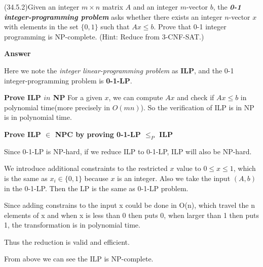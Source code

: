 \documentclass[12pt]{article}
\begin{document}
(34.5.2)Given an integer $m \times n$ matrix $A$ and an integer $m$-vector $b$, the \textbf{\textit{0-1 integer-programming problem}} asks whether there exists an integer $n$-vector $x$ with elements in the set $\{0, 1\}$ such that $Ax \le b$. Prove that 0-1 integer programming is NP-complete. (Hint: Reduce from 3-CNF-SAT.)

\textbf{Answer}

Here we note the \textit{integer linear-programming problem} as \textbf{ILP}, and the 0-1 integer-programming problem is \textbf{0-1-LP}.



\textbf{Prove ILP $in$ NP}
For a given $x$, we can compute $Ax$ and check if $Ax \leq b$ in polynomial time(more precisely in $O(mn)$). So the verification of ILP is in NP is in polynomial time.

\textbf{Prove ILP $\in$ NPC by proving 0-1-LP $\leq_{P}$ ILP}

Since 0-1-LP is NP-hard, if we reduce ILP to 0-1-LP, ILP will also be NP-hard. 

We introduce additional constraints to the restricted $x$ value to $0 \leq x \leq 1$, which is the same as $x_i \in \{0,1\}$ because $x$ is an integer. Also we take the input $(A,b)$ in the 0-1-LP. Then the LP is the same as 0-1-LP problem.

Since adding constrains to the input x could be done in O(n), which travel the n elements of x and when x is less than 0 then puts 0, when larger than 1 then puts 1, the transformation is in polynomial time.

Thus the reduction is valid and efficient.

From above we can see the ILP is NP-complete.
\end{document}
